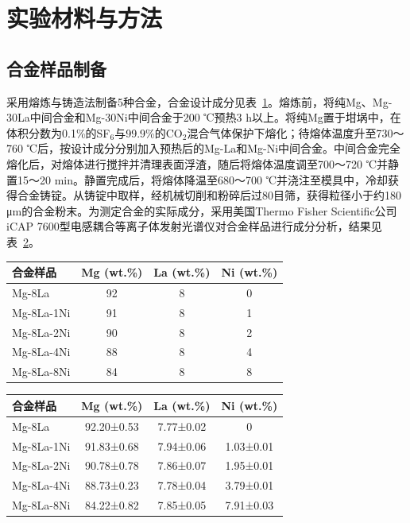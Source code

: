 \documentclass[UTF8,10pt]{ctexart}
\begin{document}
\section{实验材料与方法}
\subsection{合金样品制备}
采用熔炼与铸造法制备5种合金，合金设计成分见表~\ref{tab:1}。熔炼前，将纯Mg、Mg-30La中间合金和Mg-30Ni中间合金于200 ℃预热3 h以上。将纯Mg置于坩埚中，在体积分数为0.1\%的SF$_6$与99.9\%的CO$_2$混合气体保护下熔化；待熔体温度升至730～760 ℃后，按设计成分分别加入预热后的Mg-La和Mg-Ni中间合金。中间合金完全熔化后，对熔体进行搅拌并清理表面浮渣，随后将熔体温度调至700～720 ℃并静置15～20 min。静置完成后，将熔体降温至680～700 ℃并浇注至模具中，冷却获得合金铸锭。从铸锭中取样，经机械切削和粉碎后过80目筛，获得粒径小于约180 μm的合金粉末。为测定合金的实际成分，采用美国Thermo Fisher Scientific公司iCAP 7600型电感耦合等离子体发射光谱仪对合金样品进行成分分析，结果见表~\ref{tab:2}。

\begin{table}[htbp]
  \centering
  \label{tab:1}
  \begin{tabular}{lccc}
    \toprule
    合金样品 & Mg (wt.\%) & La (wt.\%) & Ni (wt.\%) \\
    \midrule
    Mg-8La & 92 & 8 & 0 \\
    Mg-8La-1Ni & 91 & 8 & 1 \\
    Mg-8La-2Ni & 90 & 8 & 2 \\
    Mg-8La-4Ni & 88 & 8 & 4 \\
    Mg-8La-8Ni & 84 & 8 & 8 \\
    \bottomrule
  \end{tabular}
\end{table}
\begin{table}[htbp]
  \centering
  \label{tab:2}
  \begin{tabular}{lccc}
    \toprule
    合金样品 & Mg (wt.\%) & La (wt.\%) & Ni (wt.\%) \\
    \midrule
    Mg-8La & 92.20±0.53 & 7.77±0.02 & 0 \\
    Mg-8La-1Ni & 91.83±0.68 & 7.94±0.06 & 1.03±0.01 \\
    Mg-8La-2Ni & 90.78±0.78 & 7.86±0.07 & 1.95±0.01 \\
    Mg-8La-4Ni & 88.73±0.23 & 7.78±0.04 & 3.79±0.01 \\
    Mg-8La-8Ni & 84.22±0.82 & 7.85±0.05 & 7.91±0.03 \\
    \bottomrule
  \end{tabular}
\end{table}
\end{document}
